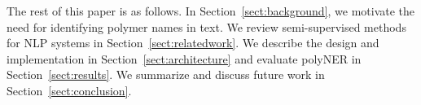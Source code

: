 The rest of this paper is as follows. 
In Section~\ref{sect:background}, we motivate the need for identifying polymer names in
text. 
We review semi-supervised methods for NLP systems in
Section~\ref{sect:relatedwork}. 
We describe the design and implementation in Section~\ref{sect:architecture} and evaluate polyNER
in Section~\ref{sect:results}. We summarize and discuss future work in Section~\ref{sect:conclusion}.